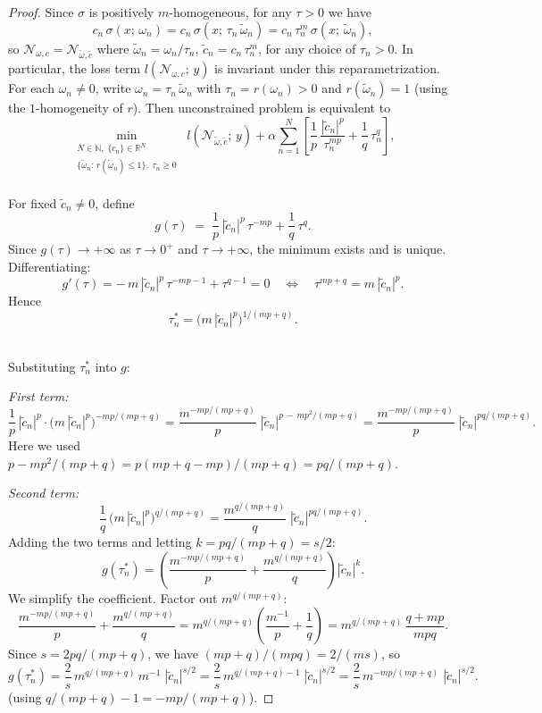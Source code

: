 \documentclass[12pt,fleqn]{amsart}
\theoremstyle{definition}
\begin{document}
\begin{proof}
	Since $\sigma$ is positively $m$-homogeneous, for any $\tau > 0$ we have
	\[
		c_n\,\sigma(x;\,\omega_n)
		= c_n\,\sigma(x;\,\tau_n\,\tilde\omega_n)
		= c_n\,\tau_n^m\,\sigma(x;\,\tilde\omega_n),
	\]
	so $\mathcal{N}_{\omega,c} = \mathcal{N}_{\tilde\omega,\tilde c}$ where $\tilde\omega_n = \omega_n / \tau_n$, $\tilde c_n = c_n\,\tau_n^m$, for any choice of $\tau_n > 0$. In particular, the loss term $l(\mathcal{N}_{\omega,c};\,y)$ is
	invariant under this reparametrization. 
	For each $\omega_n \neq 0$, write $\omega_n = \tau_n\,\tilde\omega_n$ with $\tau_n = r(\omega_n) > 0$ and $r(\tilde\omega_n) = 1$ (using the $1$-homogeneity of $r$). 
	Then unconstrained problem is equivalent to
	\[
	\min_{\substack{N \in \mathbb{N},\; \{c_n\} \in \mathbb{R}^N \\
	\{\tilde\omega_n:\, r(\tilde\omega_n) \leq 1\},\; \tau_n \geq 0}}
	\; l(\mathcal{N}_{\tilde\omega,\tilde c};\, y)
	+ \alpha \sum_{n=1}^{N}
	\left[ \frac{1}{p}\,\frac{|\tilde c_n|^p}{\tau_n^{mp}} + \frac{1}{q}\,\tau_n^q \right],
\]
\quad\\ 
For fixed $\tilde c_n \neq 0$, define
\[
	g(\tau) \;=\; \frac{1}{p}\,|\tilde c_n|^p\,\tau^{-mp} + \frac{1}{q}\,\tau^q.
\]
Since $g(\tau) \to +\infty$ as $\tau \to 0^+$ and $\tau \to +\infty$, the minimum exists and is unique. Differentiating:
\[
	g'(\tau) = -\,m\,|\tilde c_n|^p\,\tau^{-mp-1} + \tau^{q-1} = 0
	\quad\Longleftrightarrow\quad
	\tau^{mp+q} = m\,|\tilde c_n|^p.
\]
Hence
\begin{equation*}
	\tau_n^* = \bigl(m\,|\tilde c_n|^p\bigr)^{1/(mp+q)}.
\end{equation*}

\quad\\
Substituting $\tau_n^*$ into $g$:

\emph{First term:}
\[
	\frac{1}{p}\,|\tilde c_n|^p \cdot \bigl(m\,|\tilde c_n|^p\bigr)^{-mp/(mp+q)}
	= \frac{m^{-mp/(mp+q)}}{p}\;|\tilde c_n|^{p\,-\,mp^2/(mp+q)}
	= \frac{m^{-mp/(mp+q)}}{p}\;|\tilde c_n|^{pq/(mp+q)}.
\]
Here we used $p - mp^2/(mp+q) = p(mp+q-mp)/(mp+q) = pq/(mp+q)$.

\emph{Second term:}
\[
	\frac{1}{q}\,\bigl(m\,|\tilde c_n|^p\bigr)^{q/(mp+q)}
	= \frac{m^{q/(mp+q)}}{q}\;|\tilde c_n|^{pq/(mp+q)}.
\]
Adding the two terms and letting $k = pq/(mp+q) = s/2$:
\[
	g(\tau_n^*)
	= \left(\frac{m^{-mp/(mp+q)}}{p} + \frac{m^{q/(mp+q)}}{q}\right) |\tilde c_n|^{k}.
\]
We simplify the coefficient. Factor out $m^{q/(mp+q)}$:
\[
	\frac{m^{-mp/(mp+q)}}{p} + \frac{m^{q/(mp+q)}}{q}
	= m^{q/(mp+q)}\!\left(\frac{m^{-1}}{p} + \frac{1}{q}\right)
	= m^{q/(mp+q)}\,\frac{q + mp}{mpq}.
\]
Since $s = 2pq/(mp+q)$, we have $(mp+q)/(mpq) = 2/(ms)$, so
\[
	g(\tau_n^*) = \frac{2}{s}\,m^{q/(mp+q)}\,m^{-1}\;|\tilde c_n|^{s/2}
	= \frac{2}{s}\,m^{q/(mp+q) - 1}\;|\tilde c_n|^{s/2}
	= \frac{2}{s}\,m^{-mp/(mp+q)}\;|\tilde c_n|^{s/2}.
\]
(using $q/(mp+q) - 1 = -mp/(mp+q)$).
\end{proof}
\end{document}
